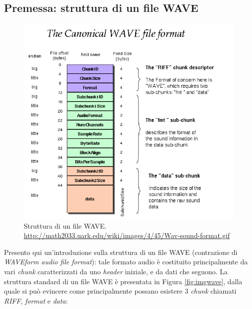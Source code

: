 \subsection{Premessa: struttura di un file WAVE}
\begin{figure}[thp]
\centering
\includegraphics[scale=0.65]{img/wav-sound-format.png}
\caption{Struttura di un file WAVE. \url{http://math2033.uark.edu/wiki/images/4/45/Wav-sound-format.gif}}
\label{fig:imgwave}
\end{figure}
Presento qui un'introduzione sulla struttura di un file WAVE (contrazione di 
\textit{WAVEform audio file format}): tale formato audio è costituito principalmente 
da vari \textit{chunk}  caratterizzati da uno \textit{header} iniziale, e da dati che 
seguono. La struttura standard di un file WAVE è presentata in  Figura
\vref{fig:imgwave}, dalla quale si può evincere come principalmente possano
esistere 3 \textit{chunk} chiamati \textit{RIFF}, \textit{format} e \textit{data}:
